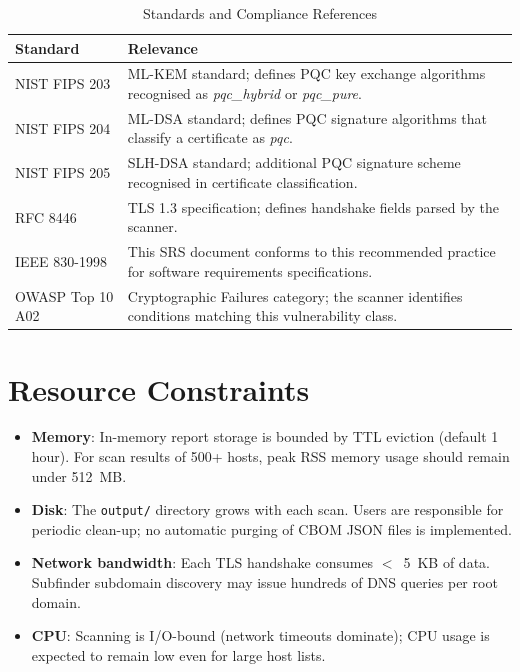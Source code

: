 \begin{table}[H]
  \centering
  \caption{Standards and Compliance References}
  \label{tab:standards}
  \begin{tabularx}{\textwidth}{L{3.5cm} L{10cm}}
    \toprule
    \textbf{Standard} & \textbf{Relevance} \\
    \midrule
    NIST FIPS 203     & ML-KEM standard; defines PQC key exchange algorithms
                        recognised as \textit{pqc\_hybrid} or \textit{pqc\_pure}. \\
    NIST FIPS 204     & ML-DSA standard; defines PQC signature algorithms that
                        classify a certificate as \textit{pqc}. \\
    NIST FIPS 205     & SLH-DSA standard; additional PQC signature scheme
                        recognised in certificate classification. \\
    RFC 8446          & TLS 1.3 specification; defines handshake fields parsed
                        by the scanner. \\
    IEEE 830-1998     & This SRS document conforms to this recommended practice
                        for software requirements specifications. \\
    OWASP Top 10 A02  & Cryptographic Failures category; the scanner identifies
                        conditions matching this vulnerability class. \\
    \bottomrule
  \end{tabularx}
\end{table}

\section{Resource Constraints}
\label{sec:resource_constraints}

\begin{itemize}[noitemsep]
  \item \textbf{Memory}: In-memory report storage is bounded by TTL eviction
        (default 1 hour). For scan results of 500+ hosts, peak RSS memory usage
        should remain under 512~MB.
  \item \textbf{Disk}: The \texttt{output/} directory grows with each scan.
        Users are responsible for periodic clean-up; no automatic purging of
        CBOM JSON files is implemented.
  \item \textbf{Network bandwidth}: Each TLS handshake consumes $<$~5~KB of
        data. Subfinder subdomain discovery may issue hundreds of DNS queries
        per root domain.
  \item \textbf{CPU}: Scanning is I/O-bound (network timeouts dominate); CPU
        usage is expected to remain low even for large host lists.
\end{itemize}

